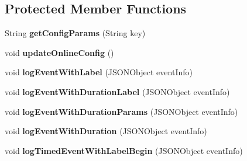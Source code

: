 \subsection*{Protected Member Functions}
\begin{DoxyCompactItemize}
\item 
\mbox{\label{classorg_1_1cocos2dx_1_1plugin_1_1AnalyticsUmeng_a6ee32631b4d6724693b0df87ce4b028f}} 
String {\bfseries get\+Config\+Params} (String key)
\item 
\mbox{\label{classorg_1_1cocos2dx_1_1plugin_1_1AnalyticsUmeng_a8e1344dae065f08f7bbba0ac17cd29eb}} 
void {\bfseries update\+Online\+Config} ()
\item 
\mbox{\label{classorg_1_1cocos2dx_1_1plugin_1_1AnalyticsUmeng_a0d1a12ec80c7da2e52dcaee6bea98f2a}} 
void {\bfseries log\+Event\+With\+Label} (J\+S\+O\+N\+Object event\+Info)
\item 
\mbox{\label{classorg_1_1cocos2dx_1_1plugin_1_1AnalyticsUmeng_ad7c6784ef03fe853c81c10a8eb98a7e1}} 
void {\bfseries log\+Event\+With\+Duration\+Label} (J\+S\+O\+N\+Object event\+Info)
\item 
\mbox{\label{classorg_1_1cocos2dx_1_1plugin_1_1AnalyticsUmeng_ae6f3b145c88c9d929633ce311a7b4742}} 
void {\bfseries log\+Event\+With\+Duration\+Params} (J\+S\+O\+N\+Object event\+Info)
\item 
\mbox{\label{classorg_1_1cocos2dx_1_1plugin_1_1AnalyticsUmeng_ae54cdb7f809dde852df65e8dce8c1b33}} 
void {\bfseries log\+Event\+With\+Duration} (J\+S\+O\+N\+Object event\+Info)
\item 
\mbox{\label{classorg_1_1cocos2dx_1_1plugin_1_1AnalyticsUmeng_a87ffe3d3ec9793d3889ab1e5907b8528}} 
void {\bfseries log\+Timed\+Event\+With\+Label\+Begin} (J\+S\+O\+N\+Object event\+Info)
\item 
\mbox{\label{classorg_1_1cocos2dx_1_1plugin_1_1AnalyticsUmeng_abb6aa1bf7152bd5a1b38ac007d33ba8a}} 

\end{DoxyCompactItemize}
